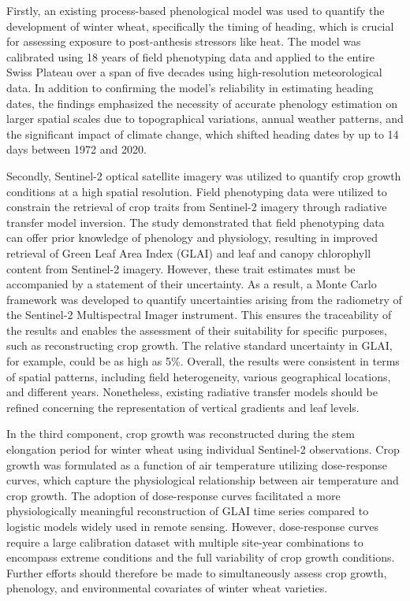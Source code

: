 Firstly, an existing process-based phenological model was used to quantify the development of winter wheat, specifically the timing of heading, which is crucial for assessing exposure to post-anthesis stressors like heat. The model was calibrated using 18 years of field phenotyping data and applied to the entire Swiss Plateau over a span of five decades using high-resolution meteorological data. In addition to confirming the model's reliability in estimating heading dates, the findings emphasized the necessity of accurate phenology estimation on larger spatial scales due to topographical variations, annual weather patterns, and the significant impact of climate change, which shifted heading dates by up to 14 days between 1972 and 2020.

Secondly, Sentinel-2 optical satellite imagery was utilized to quantify crop growth conditions at a high spatial resolution. Field phenotyping data were utilized to constrain the retrieval of crop traits from Sentinel-2 imagery through radiative transfer model inversion. The study demonstrated that field phenotyping data can offer prior knowledge of phenology and physiology, resulting in improved retrieval of Green Leaf Area Index (GLAI) and leaf and canopy chlorophyll content from Sentinel-2 imagery. However, these trait estimates must be accompanied by a statement of their uncertainty. As a result, a Monte Carlo framework was developed to quantify uncertainties arising from the radiometry of the Sentinel-2 Multispectral Imager instrument. This ensures the traceability of the results and enables the assessment of their suitability for specific purposes, such as reconstructing crop growth. The relative standard uncertainty in GLAI, for example, could be as high as 5\%. Overall, the results were consistent in terms of spatial patterns, including field heterogeneity, various geographical locations, and different years. Nonetheless, existing radiative transfer models should be refined concerning the representation of vertical gradients and leaf levels.

In the third component, crop growth was reconstructed during the stem elongation period for winter wheat using individual Sentinel-2 observations. Crop growth was formulated as a function of air temperature utilizing dose-response curves, which capture the physiological relationship between air temperature and crop growth. The adoption of dose-response curves facilitated a more physiologically meaningful reconstruction of GLAI time series compared to logistic models widely used in remote sensing. However, dose-response curves require a large calibration dataset with multiple site-year combinations to encompass extreme conditions and the full variability of crop growth conditions. Further efforts should therefore be made to simultaneously assess crop growth, phenology, and environmental covariates of winter wheat varieties. 

